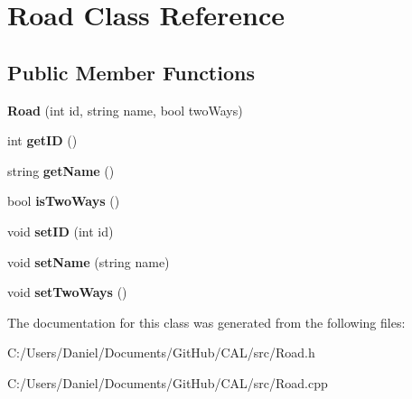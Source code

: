 \hypertarget{class_road}{}\section{Road Class Reference}
\label{class_road}
\subsection*{Public Member Functions}
\begin{DoxyCompactItemize}
\item 
\hypertarget{class_road_a38041ba91a6034c469e4be812984517a}{}\label{class_road_a38041ba91a6034c469e4be812984517a} 
{\bfseries Road} (int id, string name, bool two\+Ways)
\item 
\hypertarget{class_road_a606a7949ede7439b0476a66660036022}{}\label{class_road_a606a7949ede7439b0476a66660036022} 
int {\bfseries get\+ID} ()
\item 
\hypertarget{class_road_a900c77eae1c7adc71f2a0a4afd2fb904}{}\label{class_road_a900c77eae1c7adc71f2a0a4afd2fb904} 
string {\bfseries get\+Name} ()
\item 
\hypertarget{class_road_a43c1a2c5c198bcce6e9cc89c3854f3b6}{}\label{class_road_a43c1a2c5c198bcce6e9cc89c3854f3b6} 
bool {\bfseries is\+Two\+Ways} ()
\item 
\hypertarget{class_road_ad012d33cdc935a43cca58a814572c8d3}{}\label{class_road_ad012d33cdc935a43cca58a814572c8d3} 
void {\bfseries set\+ID} (int id)
\item 
\hypertarget{class_road_adfba201ed62d4766640fdd6baa38c13d}{}\label{class_road_adfba201ed62d4766640fdd6baa38c13d} 
void {\bfseries set\+Name} (string name)
\item 
\hypertarget{class_road_a1aaf4b3d1246f7e09fa3c32968dda5e6}{}\label{class_road_a1aaf4b3d1246f7e09fa3c32968dda5e6} 
void {\bfseries set\+Two\+Ways} ()
\end{DoxyCompactItemize}


The documentation for this class was generated from the following files\+:\begin{DoxyCompactItemize}
\item 
C\+:/\+Users/\+Daniel/\+Documents/\+Git\+Hub/\+C\+A\+L/src/Road.\+h\item 
C\+:/\+Users/\+Daniel/\+Documents/\+Git\+Hub/\+C\+A\+L/src/Road.\+cpp\end{DoxyCompactItemize}

